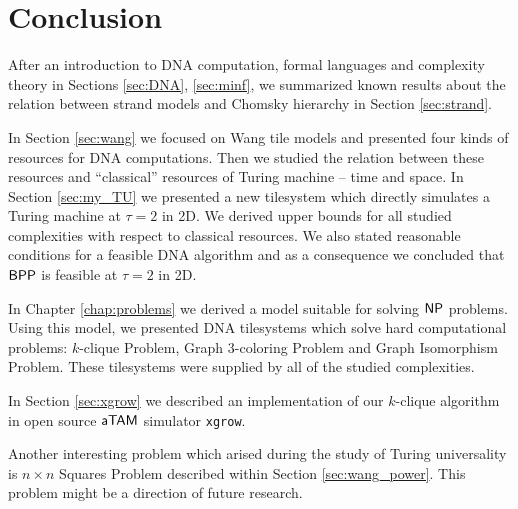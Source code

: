\cleardoublepage{}   %
\chapter*{Conclusion}

After an introduction to DNA computation, formal languages and complexity theory in Sections \ref{sec:DNA}, \ref{sec:minf}, we summarized known results about the relation between strand models and Chomsky hierarchy in Section \ref{sec:strand}.

In Section \ref{sec:wang} we focused on Wang tile models and presented four kinds of resources for DNA computations. Then we studied the relation between these resources and ``classical'' resources of Turing machine -- time and space. In Section \ref{sec:my_TU} we presented a new tilesystem which directly simulates a Turing machine at $\tau = 2$ in 2D. We derived upper bounds for all studied complexities with respect to classical resources. We also stated reasonable conditions for a feasible DNA algorithm and as a consequence we concluded that $\mathsf{BPP}$ is feasible at $\tau = 2$ in 2D.

In Chapter \ref{chap:problems} we derived a model suitable for solving $\mathsf{NP}$ problems. Using this model, we presented DNA tilesystems which solve hard computational problems: $k$-clique Problem, Graph 3-coloring Problem and Graph Isomorphism Problem. These tilesystems were supplied by all of the studied complexities.

In Section \ref{sec:xgrow} we described an implementation of our $k$-clique algorithm in open source $\mathsf{aTAM}$ simulator {\tt xgrow}.

Another interesting problem which arised during the study of Turing universality is $n\times n$ Squares Problem described within Section \ref{sec:wang_power}. This problem might be a direction of future research.


